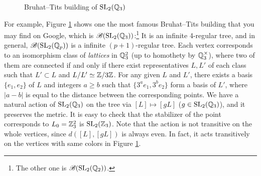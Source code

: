 \begin{figure}[h]
    \centering
    \caption{Bruhat--Tits building of $\mathrm{SL}_2(\mathbb{Q}_3)$}
    \label{fig:btsl2q3}
\end{figure}


For example, Figure \ref{fig:btsl2q3} shows one the most famous Bruhat--Tits building that you may find on Google, which is $\mathscr{B}(\mathrm{SL}_2(\mathbb{Q}_3))$:\footnote{The other one is $\mathscr{B}(\mathrm{SL}_2(\mathbb{Q}_2))$.}
It is an infinite 4-regular tree, and in general, $\mathscr{B}(\mathrm{SL}_2(\mathbb{Q}_p))$ is a infinite $(p+1)$-regular tree.
Each vertex corresponds to an isomorphism class of \emph{lattices} in $\mathbb{Q}_3^2$ (up to homothety by $\mathbb{Q}_3^\times$), where two of them are connected if and only if there exist representatives $L, L'$ of each class such that $L' \subset L$ and $L / L' \simeq \mathbb{Z}/3\mathbb{Z}$.
For any given $L$ and $L'$, there exists a basis $\{e_1, e_2\}$ of $L$ and integers $a \ge b$ such that $\{3^a e_1, 3^b e_2\}$ form a basis of $L'$, where $|a - b|$ is equal to the distance between the corresponding points.
We have a natural action of $\mathrm{SL}_2(\mathbb{Q}_3)$ on the tree via $[L] \mapsto [gL]$ ($g \in \mathrm{SL}_2(\mathbb{Q}_3)$), and it preserves the metric.
It is easy to check that the stabilizer of the point corresponds to $L_0 = \mathbb{Z}_3^2$ is $\mathrm{SL}_2(\mathbb{Z}_3)$.
Note that the action is not transitive on the whole vertices, since $d([L], [gL])$ is always even.
In fact, it acts transitively on the vertices with same  colors in Figure \ref{fig:btsl2q3}.

